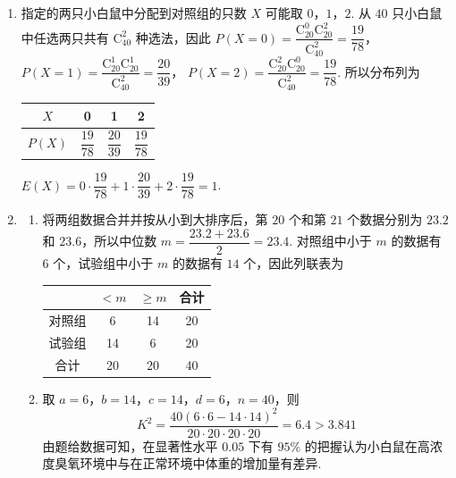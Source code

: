 \begin{solution}

\begin{enumerate}
\item 指定的两只小白鼠中分配到对照组的只数 \(X\) 可能取 \(0\)，\(1\)，\(2\). 从 \(40\) 只小白鼠中任选两只共有 \(\mathrm C_{40}^{2}\) 种选法，因此
\(P(X=0)=\dfrac{\mathrm C_{20}^{0}\mathrm C_{20}^{2}}{\mathrm C_{40}^{2}}=\dfrac{19}{78}\)，
\(P(X=1)=\dfrac{\mathrm C_{20}^{1}\mathrm C_{20}^{1}}{\mathrm C_{40}^{2}}=\dfrac{20}{39}\)，
\(P(X=2)=\dfrac{\mathrm C_{20}^{2}\mathrm C_{20}^{0}}{\mathrm C_{40}^{2}}=\dfrac{19}{78}\). 所以分布列为

\begin{center}
\begin{tabular}{c|ccc}
\hline
\(X\) & 0 & 1 & 2 \\
\hline
\(P(X)\) & \(\dfrac{19}{78}\) & \(\dfrac{20}{39}\) & \(\dfrac{19}{78}\) \\
\hline
\end{tabular}
\end{center}

\(\displaystyle E(X)=0\cdot\dfrac{19}{78}+1\cdot\dfrac{20}{39}+2\cdot\dfrac{19}{78}=1\).

\item
\begin{enumerate}
\item 将两组数据合并并按从小到大排序后，第 \(20\) 个和第 \(21\) 个数据分别为 \(23.2\) 和 \(23.6\)，所以中位数
\(m=\dfrac{23.2+23.6}{2}=23.4\). 对照组中小于 \(m\) 的数据有 \(6\) 个，试验组中小于 \(m\) 的数据有 \(14\) 个，因此列联表为

\begin{center}
\begin{tabular}{c|cc|c}
\hline
& \( <m \) & \( \ge m \) & 合计 \\
\hline
对照组 & 6 & 14 & 20 \\
试验组 & 14 & 6 & 20 \\
合计 & 20 & 20 & 40 \\
\hline
\end{tabular}
\end{center}

\item 取 \(a=6\)，\(b=14\)，\(c=14\)，\(d=6\)，\(n=40\)，则
\[
K^2=\frac{40(6\cdot6-14\cdot14)^2}{20\cdot20\cdot20\cdot20}=6.4>3.841
\]
由题给数据可知，在显著性水平 \(0.05\) 下有 \(95\%\) 的把握认为小白鼠在高浓度臭氧环境中与在正常环境中体重的增加量有差异.
\end{enumerate}
\end{enumerate}
\end{solution}

